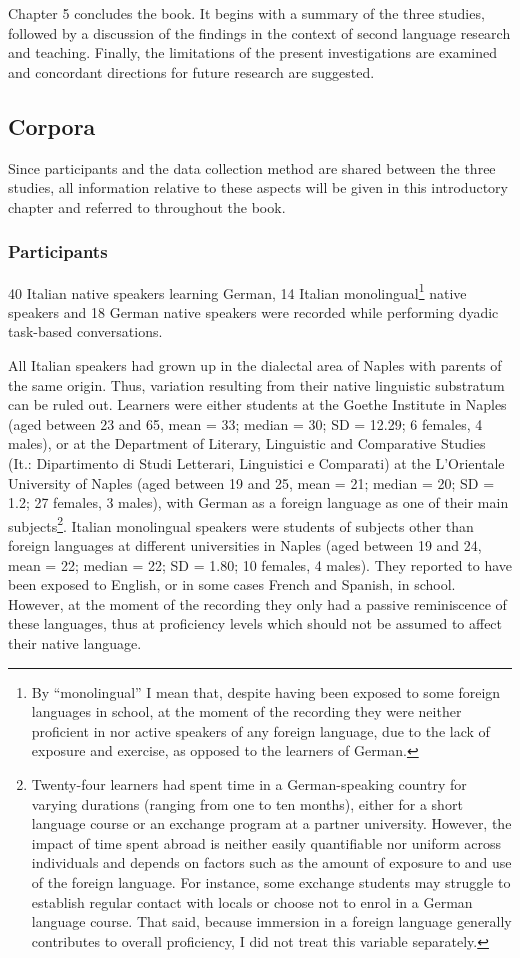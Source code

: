 Chapter 5 concludes the book. It begins with a summary of the three studies, followed by a discussion of the findings in the context of second language research and teaching. Finally, the limitations of the present investigations are examined and concordant directions for future research are suggested.

\subsection{Corpora}
\hypertarget{Toc191305878}{}
Since participants and the data collection method are shared between the three studies, all information relative to these aspects will be given in this introductory chapter and referred to throughout the book.

\subsubsection{Participants}
\hypertarget{Toc191305879}{}
40 Italian native speakers learning German, 14 Italian monolingual\footnote{By “monolingual” I mean that, despite having been exposed to some foreign languages in school, at the moment of the recording they were neither proficient in nor active speakers of any foreign language, due to the lack of exposure and exercise, as opposed to the learners of German.} native speakers and 18 German native speakers were recorded while performing dyadic task-based conversations.

All Italian speakers had grown up in the dialectal area of Naples with parents of the same origin. Thus, variation resulting from their native linguistic substratum can be ruled out. Learners were either students at the Goethe Institute in Naples (aged between 23 and 65, mean = 33; median = 30; SD = 12.29; 6 females, 4 males), or at the Department of Literary, Linguistic and Comparative Studies (It.: Dipartimento di Studi Letterari, Linguistici e Comparati) at the L’Orientale University of Naples (aged between 19 and 25, mean = 21; median = 20; SD = 1.2; 27 females, 3 males), with German as a foreign language as one of their main subjects\footnote{Twenty-four learners had spent time in a German-speaking country for varying durations (ranging from one to ten months), either for a short language course or an exchange program at a partner university. However, the impact of time spent abroad is neither easily quantifiable nor uniform across individuals and depends on factors such as the amount of exposure to and use of the foreign language. For instance, some exchange students may struggle to establish regular contact with locals or choose not to enrol in a German language course. That said, because immersion in a foreign language generally contributes to overall proficiency, I did not treat this variable separately.}. Italian monolingual speakers were students of subjects other than foreign languages at different universities in Naples (aged between 19 and 24, mean = 22; median = 22; SD = 1.80; 10 females, 4 males). They reported to have been exposed to English, or in some cases French and Spanish, in school. However, at the moment of the recording they only had a passive reminiscence of these languages, thus at proficiency levels which should not be assumed to affect their native language.

